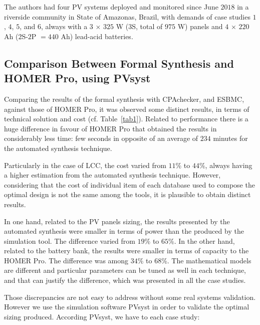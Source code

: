 \documentclass[runningheads]{llncs}
\begin{document}
The authors had four PV systems deployed and monitored since June $2018$ in a riverside community in State of Amazonas, Brazil, with demands of case studies $1$, $4$, $5$, and $6$, always with a $3$ $\times$ $325$ W ($3$S, total of $975$ W) panels and $4$ $\times$ $220$ Ah ($2$S-$2$P $= 440$ Ah) lead-acid batteries.

\subsection{Comparison Between Formal Synthesis and HOMER Pro, using PVsyst}

Comparing the results of the formal synthesis with CPAchecker, and ESBMC, against those of  HOMER Pro, it was observed some distinct results, in terms of technical solution and cost (cf. Table~\ref{tab1}).  Related to performance there is a huge difference in favour of HOMER Pro that obtained the results in considerably less time: few seconds in opposite of an average of $234$ minutes for the automated synthesis technique.

Particularly in the case of LCC, the cost varied from $11$\% to $44$\%, always having a higher estimation from the automated synthesis technique. However, considering that the cost of individual item of each database used to compose the optimal design is not the same among the tools, it is plausible to obtain distinct results.

In one hand, related to the PV panels sizing, the results presented by the automated synthesis were smaller in terms of power than the produced by the simulation tool. The difference varied from $19$\% to $65$\%. In the other hand, related to the battery bank, the results were smaller in terms of capacity to the HOMER Pro. The difference was among $34$\% to $68$\%. The mathematical models are different and particular parameters can be tuned as well in each technique, and that can justify the difference, which was presented in all the case studies.

Those discrepancies are not easy to address without some real systems validation. However we use the simulation software PVsyst in order to validate the optimal sizing produced. According PVsyst, we have to each case study:
\end{document}
